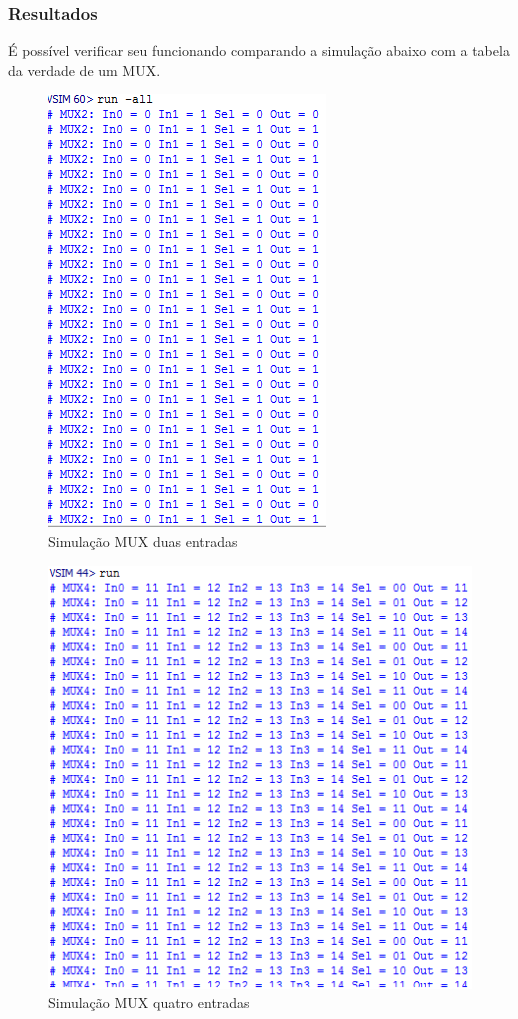 \documentclass[a4paper, 10pt]{article}
\begin{document}
\subsubsection{Resultados}
É possível verificar seu funcionando comparando a simulação abaixo com a tabela da verdade de um MUX.
\begin{figure}[H]
	\centering
	\includegraphics[scale=0.7]{simuMUX2.PNG}
	\caption{Simulação MUX duas entradas}
	\label{Rotulo}
\end{figure}
\begin{figure}[H]
	\centering
	\includegraphics[scale=0.7]{simuMUX4.PNG}
	\caption{Simulação MUX quatro entradas}
	\label{Rotulo}
\end{figure}
\end{document}
